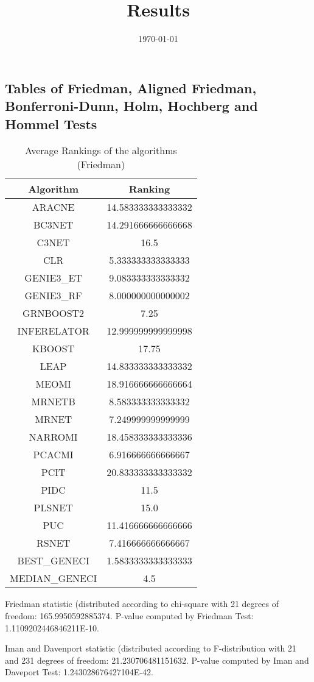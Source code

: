 \documentclass[a4paper,10pt]{article}
\title{Results}
\author{}
\date{\today}
\begin{document}
\begin{landscape}
\oddsidemargin 0in \topmargin 0in\maketitle
\section{Tables of Friedman, Aligned Friedman, Bonferroni-Dunn, Holm, Hochberg and Hommel Tests}
\begin{table}[!htp]
\centering
\caption{Average Rankings of the algorithms (Friedman)
}\begin{tabular}{c|c}
Algorithm&Ranking\\
\hline
ARACNE&14.583333333333332\\
BC3NET&14.291666666666668\\
C3NET&16.5\\
CLR&5.333333333333333\\
GENIE3_ET&9.083333333333332\\
GENIE3_RF&8.000000000000002\\
GRNBOOST2&7.25\\
INFERELATOR&12.999999999999998\\
KBOOST&17.75\\
LEAP&14.833333333333332\\
MEOMI&18.916666666666664\\
MRNETB&8.583333333333332\\
MRNET&7.249999999999999\\
NARROMI&18.458333333333336\\
PCACMI&6.916666666666667\\
PCIT&20.833333333333332\\
PIDC&11.5\\
PLSNET&15.0\\
PUC&11.416666666666666\\
RSNET&7.416666666666667\\
BEST_GENECI&1.5833333333333333\\
MEDIAN_GENECI&4.5\\
\end{tabular}
\end{table}


Friedman statistic (distributed according to chi-square with 21 degrees of freedom: 165.9950592885374. 
P-value computed by Friedman Test: 1.1109202446846211E-10.\newline

Iman and Davenport statistic (distributed according to F-distribution with 21 and 231 degrees of freedom: 21.230706481151632. 
P-value computed by Iman and Daveport Test: 1.243028676427104E-42.\newline



\end{landscape}
\end{document}
